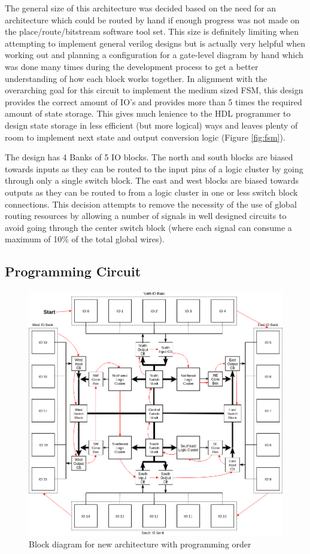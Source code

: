 \documentclass[12pt]{article}
\begin{document}
The general size of this architecture was decided based on the need for an architecture
which could be routed by hand if enough progress was not made on the place/route/bitstream software
tool set. This size is definitely limiting when attempting to implement general
verilog designs but is actually very helpful when working out and planning a configuration
for a gate-level diagram by hand which was done many times during the development process
to get a better understanding of how each block works together. In alignment with the overarching
goal for this circuit to implement the medium sized FSM, this design provides the correct amount
of IO's and provides more than 5 times the required amount of state storage. This gives much lenience 
to the HDL programmer to design state storage in less efficient (but more logical) ways and leaves
plenty of room to implement next state and output conversion logic (Figure \ref{fig:fsm}).

The design has 4 Banks of 5 IO blocks. The north and south blocks are biased towards inputs
as they can be routed to the input pins of a logic cluster by going through only a single switch
block. The east and west blocks are biased towards outputs as they can be routed to from a logic
cluster in one or less switch block connections. This decision attempts to remove the necessity 
of the use of global routing resources by allowing a number of signals
in well designed circuits to avoid going through the center switch block (where each signal can
consume a maximum of 10\% of the total global wires).

\subsection{Programming Circuit}

\begin{figure}[htb]
  \centering
  \includegraphics[width=.6\textwidth]{prog_diag}
  \caption{Block diagram for new architecture with programming order}
  \label{fig:prog_diag}
\end{figure}
\end{document}
